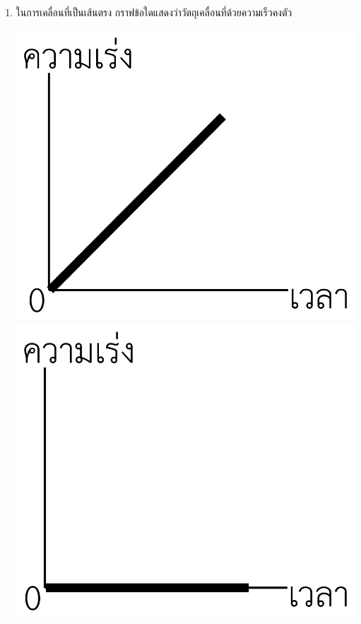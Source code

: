 \begin{enumerate}
\item \runningj \nonet ในการเคลื่อนที่เป็นเส้นตรง  กราฟข้อใดแสดงว่าวัตถุเคลื่อนที่ด้วยความเร็วคงตัว
	\begin{4c}
		{\begin{adjustbox}{valign=t}\includegraphics[width=\linewidth]{pic-17-1.pdf}\end{adjustbox}}
		{\begin{adjustbox}{valign=t}\includegraphics[width=\linewidth]{pic-17-2.pdf}\end{adjustbox}}

\end{4c}
\end{enumerate}
